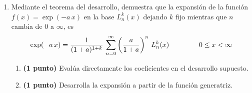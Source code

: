 \begin{enumerate}
\item Mediante el teorema del desarrollo, demuestra que la expansión de la función $f(x) = \exp(- a \, x)$ en la base $L_{n}^{k} (x)$ dejando $k$ fijo mientras que $n$ cambia de $0$ a $\infty$, es
\begin{align*}
\exp(-a \, x) = \dfrac{1}{(1 + a)^{1 + k}} \, \sum_{n=0}^{\infty} \left( \dfrac{a}{1 + a} \right)^{n} \, L_{n}^{k} (x) \hspace{1.5cm} 0 \leq x < \infty
\end{align*}
\begin{enumerate}
\item \textbf{(1 punto) } Evalúa directamente los coeficientes en el desarrollo supuesto.
\item \textbf{(1 punto) } Desarrolla la expansión a partir de la función generatriz.
\end{enumerate}
\end{enumerate}
